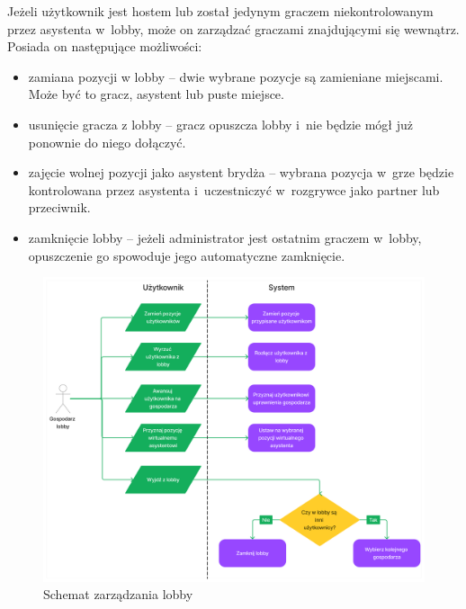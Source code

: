 Jeżeli użytkownik jest hostem lub został jedynym
graczem niekontrolowanym przez asystenta w~lobby, może on zarządzać graczami
znajdującymi się
wewnątrz. Posiada on następujące możliwości:
\begin{itemize}
  \item zamiana pozycji w lobby -- dwie wybrane pozycje są zamieniane miejscami.
        Może być to gracz, asystent lub puste miejsce.
  \item usunięcie gracza z lobby -- gracz opuszcza lobby i~nie będzie
        mógł już ponownie do niego dołączyć.
  \item zajęcie wolnej pozycji jako asystent brydża -- wybrana pozycja
        w~grze będzie kontrolowana przez asystenta
        i~uczestniczyć w~rozgrywce jako partner lub przeciwnik.
  \item zamknięcie lobby -- jeżeli administrator jest ostatnim
        graczem w~lobby, opuszczenie go spowoduje jego automatyczne
        zamknięcie.

\end{itemize}

\begin{figure}[h]
  \centering
  \includegraphics[width=\textwidth]{img/schematy/manage_lobby.png}
  \caption{Schemat zarządzania lobby}
\end{figure}

\FloatBarrier

